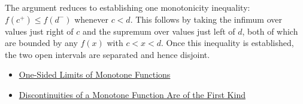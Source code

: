 \begin{remark*}
The argument reduces to establishing one monotonicity inequality: $f(c^{+}) \leq f(d^{-})$ whenever $c < d$. This follows by taking the infimum over values just right of $c$ and the supremum over values just left of $d$, both of which are bounded by any $f(x)$ with $c < x < d$. Once this inequality is established, the two open intervals are separated and hence disjoint.
\end{remark*}

\begin{dependencies}
\begin{itemize}
  \item \hyperref[thm:monotone-one-sided-limits]{One-Sided Limits of Monotone Functions}
  \item \hyperref[prop:monotone-discontinuities-first-kind]{Discontinuities of a Monotone Function Are of the First Kind}
\end{itemize}
\end{dependencies}

\clearpage
